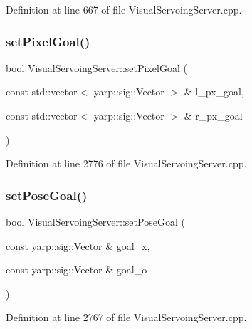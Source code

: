 Definition at line 667 of file Visual\+Servoing\+Server.\+cpp.

\mbox{\label{classVisualServoingServer_aea96fc77c6255e0826bd17190214a29b}} 
\subsubsection{\texorpdfstring{set\+Pixel\+Goal()}{setPixelGoal()}}
{\footnotesize\ttfamily bool Visual\+Servoing\+Server\+::set\+Pixel\+Goal (\begin{DoxyParamCaption}\item[{const std\+::vector$<$ yarp\+::sig\+::\+Vector $>$ \&}]{l\+\_\+px\+\_\+goal,  }\item[{const std\+::vector$<$ yarp\+::sig\+::\+Vector $>$ \&}]{r\+\_\+px\+\_\+goal }\end{DoxyParamCaption})\hspace{0.3cm}{\ttfamily [private]}}



Definition at line 2776 of file Visual\+Servoing\+Server.\+cpp.

\mbox{\label{classVisualServoingServer_a53616791e66a24c1131e2cb3a3634a6d}} 
\subsubsection{\texorpdfstring{set\+Pose\+Goal()}{setPoseGoal()}}
{\footnotesize\ttfamily bool Visual\+Servoing\+Server\+::set\+Pose\+Goal (\begin{DoxyParamCaption}\item[{const yarp\+::sig\+::\+Vector \&}]{goal\+\_\+x,  }\item[{const yarp\+::sig\+::\+Vector \&}]{goal\+\_\+o }\end{DoxyParamCaption})\hspace{0.3cm}{\ttfamily [private]}}



Definition at line 2767 of file Visual\+Servoing\+Server.\+cpp.

